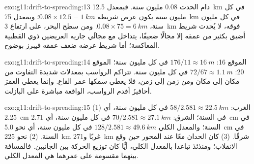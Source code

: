 \begin{solution}{exo:g11:drift-to-spreading:13}
دام الحدث \num{0.08} مليون سنة. فبمعدل \qty{12.5}{km} في كل مليون سنة
يكون عرض شريطه $0.08 \times 12.5 = \qty{1}{km}$؛ وبمعدل \qty{75}{km} في كل
مليون سنة، $0.08 \times 75 = \qty{6}{km}$. ومن سطح البحر، على ارتفاع
\qty{3}{km} فوقه، لا يُحدث شريط أضيق بكثير من عمقه إلا مجالًا ضعيفًا،
يتداخل مع مجالَي جاريه العريضين ذوي القطبية
المعاكسة؛ أما شريط عرضه ضعف عمقه فيبرز بوضوح.
\end{solution}

\begin{solution}{exo:g11:drift-to-spreading:14}
الموقع 16: $176/11 \approx \qty{16}{m}$ في كل مليون سنة؛ الموقع 20: $72/67
\approx \qty{1.1}{m}$ في كل مليون سنة. تتراكم الرواسب بمعدلات شديدة
التفاوت من مكان إلى مكان ومن زمن إلى زمن، فلا يعطي سمكها
عمر القاع. وإنما يعطي العمرَ أحافيرُ أقدم
الرواسب، الواقعة مباشرة على البازلت.
\end{solution}

\begin{solution}{exo:g11:drift-to-spreading:15}
(1) الغرب: $58/2.581 \approx \qty{22.5}{km}$ في كل مليون سنة، أي
\qty{2.25}{cm} في السنة؛ الشرق: $70/2.581 \approx \qty{27.1}{km}$ في كل مليون
سنة، أي \qty{2.71}{cm} في السنة؛ والمعدل الكلي $128/2.581 \approx \qty{49.6}{km}$ في كل
مليون سنة، أي نحو \qty{5.0}{cm} في السنة. (2) نحو \qty{225}{km} غربًا
و\qty{271}{km} شرقًا. (3) كان الحدان معًا عند المحور حين وقع
الانقلاب؛ ومنذئذ تباعدا بالمعدل الكلي، أيًّا كان توزيع
الحركة بين الجانبين. فالمسافة بينهما مقسومة على
عمرهما هي المعدل الكلي.
\end{solution}

